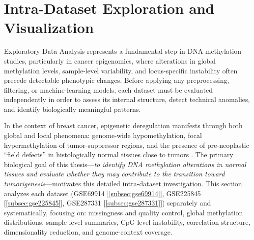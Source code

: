 \documentclass[10pt]{extarticle}
\begin{document}
\begin{abstract}
\begin{itemize}[label=-]
    \item   
    \href{https://github.com/elisabettaroviera/THESIS/blob/main/01%20-%20Notebook/01%20-%20Data%20Exploration%20%26%20Visualization/01-correction-bias-type-i-vs-type-ii.ipynb}{\textbf{01-correction-bias-type-i-vs-type-ii.ipynb}}  
    -- Implements probe-design bias diagnostics and BMIQ normalization for GSE287331, reconstructing a 
    Type~I/II–balanced $\beta$-matrix suitable for inter-cohort comparability and downstream modelling.

\end{itemize}

Collectively, these notebooks provide a unified, reproducible exploration framework that highlights both
shared and dataset-specific features of the Normal–Adjacent–Tumor axis.  
They form the methodological foundation for the subsequent discovery of early epigenetic alterations in
Adjacent tissue and for their replication across independent cohorts.
\end{abstract}



\section{Intra-Dataset Exploration and Visualization}
\label{sec:intra_dataset}

Exploratory Data Analysis represents a fundamental step in DNA methylation studies, 
particularly in cancer epigenomics, where alterations in global methylation levels, 
sample-level variability, and locus-specific instability often precede detectable 
phenotypic changes. Before applying any preprocessing, filtering, or 
machine-learning models, each dataset must be evaluated independently in order to assess 
its internal structure, detect technical anomalies, and identify biologically meaningful 
patterns.

In the context of breast cancer, epigenetic deregulation manifests through both global and 
local phenomena: genome-wide hypomethylation, focal hypermethylation of tumor-suppressor 
regions, and the presence of pre-neoplastic ``field defects'' in histologically normal 
tissues close to tumors \cite{ehrlich2002, bird2002, teschendorff2016}. 
The primary biological goal of this thesis—\emph{to identify DNA methylation alterations 
in normal tissues and evaluate whether they may contribute to the transition toward 
tumorigenesis}—motivates this detailed intra-dataset investigation.
This section analyzes each dataset (GSE69914 [\ref{subsec:gse69914}], GSE225845 [\ref{subsec:gse225845}], GSE287331 [\ref{subsec:gse287331}]) separately and 
systematically, focusing on:
missingness and quality control, global methylation distributions, sample-level summaries, 
CpG-level instability, correlation structure, dimensionality reduction, and genome-context 
coverage.
\end{document}
